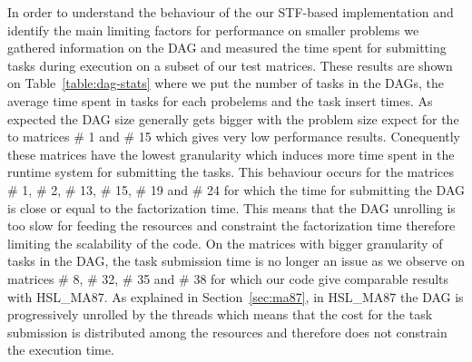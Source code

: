 \documentclass{article}
\newcommand{\alert}[1]{\textcolor{red}{#1}\xspace}
\newcommand{\starpu}{{StarPU}\xspace}
\newcommand{\TODO}[1]{\alert{TODO: #1}\xspace}
\newcommand{\openmp}{OpenMP\xspace}
\newcommand{\ma}{HSL\_MA87\xspace}
\begin{document}
In order to understand the behaviour of the our STF-based
implementation and identify the main limiting factors for performance
on smaller problems we gathered information on the DAG and measured
the time spent for submitting tasks during execution on a subset of
our test matrices. These results are shown on
Table~\ref{table:dag-stats} where we put the number of tasks in the
DAGs, the average time spent in tasks for each probelems and the task
insert times. As expected the DAG size generally gets bigger with the
problem size expect for the to matrices \# 1 and \# 15 which gives
very low performance results. Conequently these matrices have the
lowest granularity which induces more time spent in the runtime system
for submitting the tasks. This behaviour occurs for the matrices \# 1,
\# 2, \# 13, \# 15, \# 19 and \# 24 for which the time for submitting
the DAG is close or equal to the factorization time. This means that
the DAG unrolling is too slow for feeding the resources and constraint
the factorization time therefore limiting the scalability of the
code. On the matrices with bigger granularity of tasks in the DAG, the
task submission time is no longer an issue as we observe on matrices
\# 8, \# 32, \# 35 and \# 38 for which our code give comparable
results with \ma. As explained in Section~\ref{sec:ma87}, in \ma the
DAG is progressively unrolled by the threads which means that the cost
for the task submission is distributed among the resources and
therefore does not constrain the execution time.


\begin{table}[htbp]
    \begin{center}
      \texttt{ }
    \end{center}
    \caption{\label{table:exp-times}Factorization times (seconds)
      obtained with MA87 and SpLLT with both \openmp and \starpu
      versions. The factorizations were run with the block sizes
      \texttt{nb=(256, 384, 512, 768, 1024)} on 28 cores and
      \texttt{nemin=32}.}
\end{table}
\end{document}
